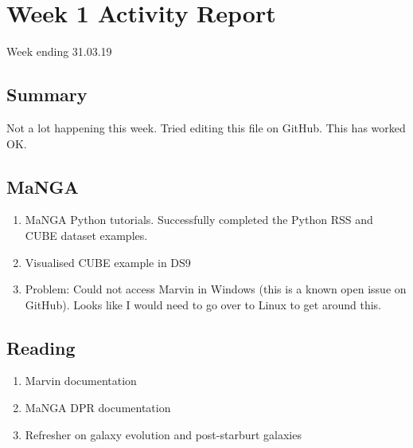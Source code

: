 \section{Week 1 Activity Report}
Week ending 31.03.19

\subsection{Summary}
Not a lot happening this week. Tried editing this file on GitHub. This has worked OK.

\subsection{MaNGA}
\begin{enumerate}
    \item MaNGA Python tutorials. Successfully completed the Python RSS and CUBE dataset examples.
    \item Visualised CUBE example in DS9
    \item Problem: Could not access Marvin in Windows (this is a known open issue on GitHub). Looks like I would need to go over to Linux to get around this.
\end{enumerate}

\subsection{Reading}
\begin{enumerate}
    \item Marvin documentation
    \item MaNGA DPR documentation
    \item Refresher on galaxy evolution and post-starburt galaxies \citep{sparke2007galaxies}
\end{enumerate}    
